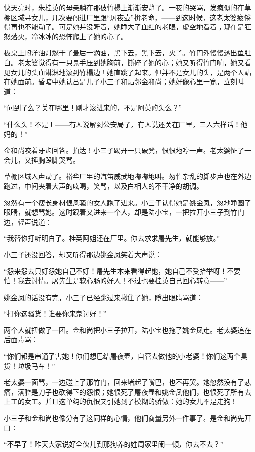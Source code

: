 \par 快天亮时，朱桂英的母亲躺在那破竹榻上渐渐安静了。一夜的哭骂，发疯似的在草棚区域寻女儿，几次要闯进厂里跟“屠夜壶”拚老命，——到这时候，这老太婆疲倦得再也不能动了。可是她并没睡着，她睁大了血红的老眼，虚空地看着；现在是狂怒落火，冷冰冰的恐怖爬上了她的心了。
\par 板桌上的洋油灯燃干了最后一滴油，黑下去，黑下去，灭了。竹门外慢慢透出鱼肚白。老太婆觉得有一只鬼手压到她胸前，撕碎了她的心；她又听得竹门响，她又看见女儿的头血淋淋地滚到竹榻边！她直跳了起来。但并不是女儿的头，是两个人站在她面前。昏暗中她认出是儿子小三子和贴邻金和尚；她好像心里一宽，立刻叫道：
\par “问到了么？关在哪里！刚才滚进来的，不是阿英的头么？”
\par “什么头！不是！——有人说解到公安局了，有人说还关在厂里，三人六样话！他妈的！”
\par 金和尚咬着牙齿回答。拍达！小三子踢开一只破凳，恨恨地哼一声。老太婆怔了一会儿，又捶胸跺脚哭骂。
\par 草棚区域人声动了。裕华厂里的汽笛威武地嘟嘟地叫。匆忙杂乱的脚步声也在外边跑过，中间夹着大声的吆喝，笑骂，以及白相人的不干净的胡调。
\par 忽然有一个瘦长身材很风骚的女人跑了进来。小三子认得她是姚金凤，忽地睁圆了眼睛，就想骂她。这时跟着又进来一个人，却是陆小宝，一把拉开小三子到竹门边，轻声说道：
\par “我替你打听明白了。桂英阿姐还在厂里。你去求求屠先生，就能够放。”
\par 小三子还没回答，却又听得那边姚金凤笑着大声说：
\par “怨来怨去只好怨她自己不好！屠先生本来看得起她，她自己不受抬举呀！不要怕！我去讨情。屠先生是软心肠的好人！不过也要桂英自己回心转意——”
\par 姚金凤的话没有完，小三子已经跳过来揪住了她，瞪出眼睛骂道：
\par “打你这骚货！谁要你来鬼讨好！”
\par 两个人就扭做了一团。金和尚把小三子拉开，陆小宝也拖了姚金凤走。老太婆追在后面毒骂：
\par “你们都是串通了害她！你们想巴结屠夜壶，自管去做他的小老婆！你们这两个臭货！垃圾马车！”
\par 老太婆一面骂，一边碰上了那竹门，回来堵起了嘴巴，也不再哭。她忽然没有了悲痛，满腔是刀子也砍得下的怨恨；她恨死了屠夜壶和姚金凤他们，也恨死了所有去上工的女工。并且这单纯的仇恨又引她到了模糊的骄傲：她的女儿不是走狗！
\par 小三子和金和尚也像分有了这同样的心情，他们商量另外一件事了。是金和尚先开口：
\par “不早了！昨天大家说好全伙儿到那狗养的姓周家里闹一顿，你去不去？”
